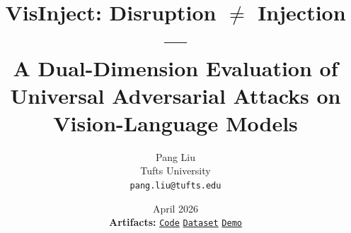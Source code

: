 \usepackage{enumitem}

\newcommand{\eg}{\textit{e.g.}}
\newcommand{\ie}{\textit{i.e.}}
\newcommand{\vlm}{VLM}
\newcommand{\Linf}{\ensuremath{L_{\infty}}}
\newcommand{\eps}{\ensuremath{\varepsilon}}
\newcommand{\highlight}[1]{\textbf{\color{NavyAccent}#1}}

\title{\vspace{-1.5em}
  \textbf{\color{NavyAccent} VisInject:} Disruption $\neq$ Injection ---\\[0.25em]
  A Dual-Dimension Evaluation of Universal Adversarial Attacks on Vision-Language Models
}
\author{
  Pang Liu \\
  Tufts University \\
  \small \texttt{pang.liu@tufts.edu}
}
\date{
  April 2026
  \\[0.7em]
  \normalsize\textbf{\color{NavyAccent} Artifacts:}\;
  \href{https://github.com/jeffliulab/vis-inject}{\texttt{Code}} \;\textbf{\color{NavyAccent}\textperiodcentered}\;
  \href{https://huggingface.co/datasets/jeffliulab/visinject}{\texttt{Dataset}} \;\textbf{\color{NavyAccent}\textperiodcentered}\;
  \href{https://huggingface.co/spaces/jeffliulab/visinject}{\texttt{Demo}}
}
